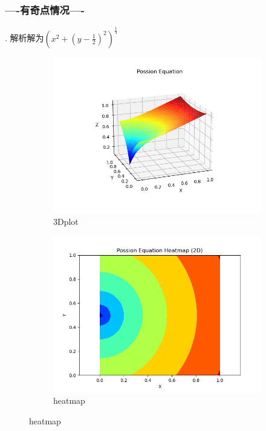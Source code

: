 \subsubsection*{----有奇点情况----}.
解析解为$(x^2+(y-\frac{1}{2})^2)^{\frac{1}{4}}$
\begin{figure}[H]
    \centering  
    \begin{subfigure}{0.5\textwidth}  
        \centering  
        \includegraphics[width=0.9\linewidth]{./pics/final/possion/2d/jumpsol3D.png}  
        \caption{3Dplot}  
    \end{subfigure}%
    \begin{subfigure}{0.5\textwidth}  
        \centering  
        \includegraphics[width=0.9\linewidth]{./pics/final/possion/2d/jumpsolheat.png}  
        \caption{heatmap}
    \end{subfigure}  


\end{figure}
